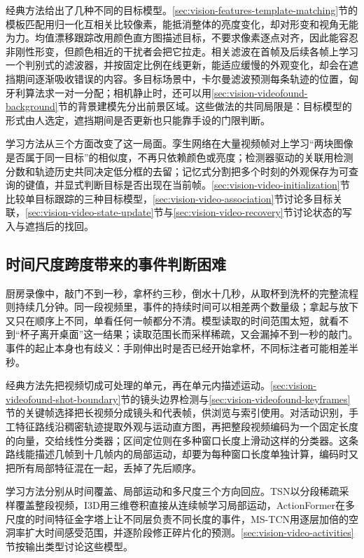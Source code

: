 经典方法给出了几种不同的目标模型。\ref{sec:vision-features-template-matching}节的模板匹配用归一化互相关比较像素，能抵消整体的亮度变化，却对形变和视角无能为力。均值漂移跟踪改用颜色直方图描述目标，不要求像素逐点对齐，因此能容忍非刚性形变，但颜色相近的干扰者会把它拉走。相关滤波在首帧及后续各帧上学习一个判别式的滤波器，并按固定比例在线更新，能适应缓慢的外观变化，却会在遮挡期间逐渐吸收错误的内容。多目标场景中，卡尔曼滤波预测每条轨迹的位置，匈牙利算法求一对一分配；相机静止时，还可以用\ref{sec:vision-videofound-background}节的背景建模先分出前景区域。这些做法的共同局限是：目标模型的形式由人选定，遮挡期间是否更新也只能靠手设的门限判断。

学习方法从三个方面改变了这一局面。孪生网络在大量视频帧对上学习“两块图像是否属于同一目标”的相似度，不再只依赖颜色或亮度；检测器驱动的关联用检测分数和轨迹历史共同决定低分框的去留；记忆式分割把多个时刻的外观保存为可查询的键值，并显式判断目标是否出现在当前帧。\ref{sec:vision-video-initialization}节比较单目标跟踪的三种目标模型，\ref{sec:vision-video-association}节讨论多目标关联，\ref{sec:vision-video-state-update}节与\ref{sec:vision-video-recovery}节讨论状态的写入与遮挡后的找回。

\subsection{时间尺度跨度带来的事件判断困难}
\label{sec:vision-video-challenge-timescale}

厨房录像中，敲门不到一秒，拿杯约三秒，倒水十几秒，从取杯到洗杯的完整流程则持续几分钟。同一段视频里，事件的持续时间可以相差两个数量级；拿起与放下又只在顺序上不同，单看任何一帧都分不清。模型读取的时间范围太短，就看不到“杯子离开桌面”这一结果；读取范围长而采样稀疏，又会漏掉不到一秒的敲门。事件的起止本身也有歧义：手刚伸出时是否已经开始拿杯，不同标注者可能相差半秒。

经典方法先把视频切成可处理的单元，再在单元内描述运动。\ref{sec:vision-videofound-shot-boundary}节的镜头边界检测与\ref{sec:vision-videofound-keyframes}节的关键帧选择把长视频分成镜头和代表帧，供浏览与索引使用。对活动识别，手工特征路线沿稠密轨迹提取外观与运动直方图，再把整段视频编码为一个固定长度的向量，交给线性分类器；区间定位则在多种窗口长度上滑动这样的分类器。这条路线能描述几帧到十几帧内的局部运动，却要为每种窗口长度单独计算，编码时又把所有局部特征混在一起，丢掉了先后顺序。

学习方法分别从时间覆盖、局部运动和多尺度三个方向回应。TSN以分段稀疏采样覆盖整段视频，I3D用三维卷积直接从连续帧学习局部运动，ActionFormer在多尺度的时间特征金字塔上让不同层负责不同长度的事件，MS-TCN用逐层加倍的空洞率扩大时间感受范围，并逐阶段修正碎片化的预测。\ref{sec:vision-video-activities}节按输出类型讨论这些模型。

